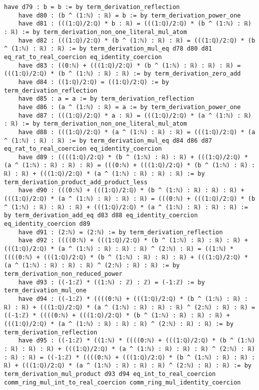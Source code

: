 \documentclass{article}
\begin{document}
\begin{tcolorbox}[colback=white!10, width=\linewidth]
\begin{lstlisting}[language=Lean4]
    have d79 : b = b := by term_derivation_reflection
    have d80 : (b ^ (1:ℕ) : ℝ) = b := by term_derivation_power_one
    have d81 : (((1:ℚ)/2:ℚ) * b : ℝ) = (((1:ℚ)/2:ℚ) * (b ^ (1:ℕ) : ℝ) : ℝ) := by term_derivation_non_one_literal_mul_atom
    have d82 : (((1:ℚ)/2:ℚ) * (b ^ (1:ℕ) : ℝ) : ℝ) = (((1:ℚ)/2:ℚ) * (b ^ (1:ℕ) : ℝ) : ℝ) := by term_derivation_mul_eq d78 d80 d81 eq_rat_to_real_coercion eq_identity_coercion
    have d83 : ((0:ℕ) + (((1:ℚ)/2:ℚ) * (b ^ (1:ℕ) : ℝ) : ℝ) : ℝ) = (((1:ℚ)/2:ℚ) * (b ^ (1:ℕ) : ℝ) : ℝ) := by term_derivation_zero_add
    have d84 : ((1:ℚ)/2:ℚ) = ((1:ℚ)/2:ℚ) := by term_derivation_reflection
    have d85 : a = a := by term_derivation_reflection
    have d86 : (a ^ (1:ℕ) : ℝ) = a := by term_derivation_power_one
    have d87 : (((1:ℚ)/2:ℚ) * a : ℝ) = (((1:ℚ)/2:ℚ) * (a ^ (1:ℕ) : ℝ) : ℝ) := by term_derivation_non_one_literal_mul_atom
    have d88 : (((1:ℚ)/2:ℚ) * (a ^ (1:ℕ) : ℝ) : ℝ) = (((1:ℚ)/2:ℚ) * (a ^ (1:ℕ) : ℝ) : ℝ) := by term_derivation_mul_eq d84 d86 d87 eq_rat_to_real_coercion eq_identity_coercion
    have d89 : ((((1:ℚ)/2:ℚ) * (b ^ (1:ℕ) : ℝ) : ℝ) + (((1:ℚ)/2:ℚ) * (a ^ (1:ℕ) : ℝ) : ℝ) : ℝ) = (((0:ℕ) + (((1:ℚ)/2:ℚ) * (b ^ (1:ℕ) : ℝ) : ℝ) : ℝ) + (((1:ℚ)/2:ℚ) * (a ^ (1:ℕ) : ℝ) : ℝ) : ℝ) := by term_derivation_product_add_product_less
    have d90 : (((0:ℕ) + (((1:ℚ)/2:ℚ) * (b ^ (1:ℕ) : ℝ) : ℝ) : ℝ) + (((1:ℚ)/2:ℚ) * (a ^ (1:ℕ) : ℝ) : ℝ) : ℝ) = (((0:ℕ) + (((1:ℚ)/2:ℚ) * (b ^ (1:ℕ) : ℝ) : ℝ) : ℝ) + (((1:ℚ)/2:ℚ) * (a ^ (1:ℕ) : ℝ) : ℝ) : ℝ) := by term_derivation_add_eq d83 d88 eq_identity_coercion eq_identity_coercion d89
    have d91 : (2:ℕ) = (2:ℕ) := by term_derivation_reflection
    have d92 : ((((0:ℕ) + (((1:ℚ)/2:ℚ) * (b ^ (1:ℕ) : ℝ) : ℝ) : ℝ) + (((1:ℚ)/2:ℚ) * (a ^ (1:ℕ) : ℝ) : ℝ) : ℝ) ^ (2:ℕ) : ℝ) = ((1:ℕ) * ((((0:ℕ) + (((1:ℚ)/2:ℚ) * (b ^ (1:ℕ) : ℝ) : ℝ) : ℝ) + (((1:ℚ)/2:ℚ) * (a ^ (1:ℕ) : ℝ) : ℝ) : ℝ) ^ (2:ℕ) : ℝ) : ℝ) := by term_derivation_non_reduced_power
    have d93 : ((-1:ℤ) * ((1:ℕ) : ℤ) : ℤ) = (-1:ℤ) := by term_derivation_mul_one
    have d94 : ((-1:ℤ) * ((((0:ℕ) + (((1:ℚ)/2:ℚ) * (b ^ (1:ℕ) : ℝ) : ℝ) : ℝ) + (((1:ℚ)/2:ℚ) * (a ^ (1:ℕ) : ℝ) : ℝ) : ℝ) ^ (2:ℕ) : ℝ) : ℝ) = ((-1:ℤ) * ((((0:ℕ) + (((1:ℚ)/2:ℚ) * (b ^ (1:ℕ) : ℝ) : ℝ) : ℝ) + (((1:ℚ)/2:ℚ) * (a ^ (1:ℕ) : ℝ) : ℝ) : ℝ) ^ (2:ℕ) : ℝ) : ℝ) := by term_derivation_reflection
    have d95 : ((-1:ℤ) * ((1:ℕ) * ((((0:ℕ) + (((1:ℚ)/2:ℚ) * (b ^ (1:ℕ) : ℝ) : ℝ) : ℝ) + (((1:ℚ)/2:ℚ) * (a ^ (1:ℕ) : ℝ) : ℝ) : ℝ) ^ (2:ℕ) : ℝ) : ℝ) : ℝ) = ((-1:ℤ) * ((((0:ℕ) + (((1:ℚ)/2:ℚ) * (b ^ (1:ℕ) : ℝ) : ℝ) : ℝ) + (((1:ℚ)/2:ℚ) * (a ^ (1:ℕ) : ℝ) : ℝ) : ℝ) ^ (2:ℕ) : ℝ) : ℝ) := by term_derivation_mul_product d93 d94 eq_int_to_real_coercion comm_ring_mul_int_to_real_coercion comm_ring_mul_identity_coercion

\end{lstlisting}
\end{tcolorbox}
\end{document}
